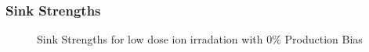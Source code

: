 \documentclass[a4paper]{article}
\begin{document}
    \subsubsection{Sink Strengths}
      \begin{figure}[h!]  %
        \centering
        \qquad
        \caption{Sink Strengths for low dose ion irradation with 0\% Production Bias}
        \label{figure:sink_strengths_ion_0_1e-6}
      \end{figure}
\end{document}
